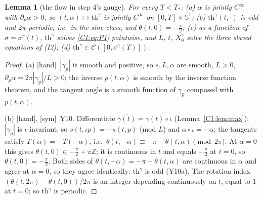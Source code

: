 \documentclass[11pt]{article}
\newtheorem{lemma}{Lemma}[section]\newtheorem{proposition}[lemma]{Proposition}\newtheorem{theorem}[lemma]{Theorem}\newtheorem{remark}[lemma]{Remark}
\newcommand{\tH}{\textup{[hand]}}\newcommand{\tS}{\textup{[sym]}}\newcommand{\tC}{\textup{[cert]}}\newcommand{\tI}{\textup{[cited]}}\newcommand{\tN}{\textup{[num]}}
\begin{document}
\begin{lemma}[the flow in step 4's gauge]\label{C1:lem:gauge}
For every $T<T_*$: (a) $\alpha$ is jointly $C^\infty$ with $\partial_p\alpha>0$, so $(t,\alpha)\mapsto\mathrm{th}^\gamma$ is jointly $C^\infty$ on $[0,T]\times\mathbb S^1$; (b) $\mathrm{th}^\gamma(t,\cdot)$ is odd and $2\pi$-periodic, i.e.\ in the sine class, and $\theta(t,0)=-\frac\pi2$; (c) as a function of $\sigma=\sigma^\gamma(t)$, $\mathrm{th}^\gamma$ solves \eqref{C1:eq:P1} pointwise, and $L$, $t$, $X_0^\gamma$ solve the three slaved equations of (I2); (d) $\mathrm{th}^\gamma\in\mathcal C([0,\sigma^\gamma(T)])$.
\end{lemma}
\begin{proof}
(a) \tH\ $|\gamma_p|$ is smooth and positive, so $s,L,\alpha$ are smooth, $L>0$, $\partial_p\alpha=2\pi|\gamma_p|/L>0$; the inverse $p(t,\alpha)$ is smooth by the inverse function theorem, and the tangent angle is a smooth function of $\gamma_p$ composed with $p(t,\alpha)$.

(b) \tH, \tS\ Y10. Differentiate $\overline{\gamma(t)}=\gamma(t)\circ\iota$ (Lemma~\ref{C1:lem:max}): $|\gamma_p|$ is $\iota$-invariant, so $s(t,\iota p)=-s(t,p)$ (mod $L$) and $\alpha\circ\iota=-\alpha$; the tangents satisfy $\overline{T(\alpha)}=-T(-\alpha)$, i.e.\ $\theta(t,-\alpha)\equiv-\pi-\theta(t,\alpha)\pmod{2\pi}$. At $\alpha=0$ this gives $\theta(t,0)\in-\frac\pi2+\pi\mathbb Z$; it is continuous in $t$ and equals $-\frac\pi2$ at $t=0$, so $\theta(t,0)=-\frac\pi2$. Both sides of $\theta(t,-\alpha)=-\pi-\theta(t,\alpha)$ are continuous in $\alpha$ and agree at $\alpha=0$, so they agree identically: $\mathrm{th}^\gamma$ is odd (Y10a). The rotation index $(\theta(t,2\pi)-\theta(t,0))/2\pi$ is an integer depending continuously on $t$, equal to $1$ at $t=0$; so $\mathrm{th}^\gamma$ is periodic.


\end{proof}
\end{document}
